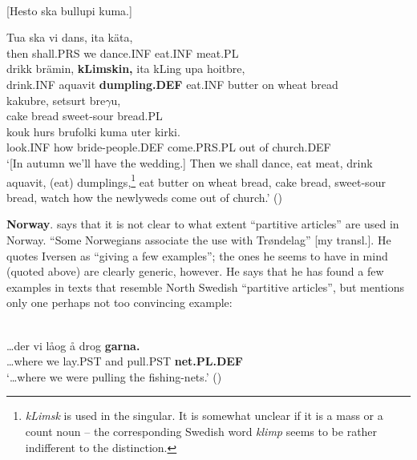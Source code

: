 
\ea\label{}
\\
{}[Hesto ska bullupi kuma.] 

\gll 	Tua  ska  vi  dans,  ita  käta,\\
		then   shall.PRS  we  dance.INF  eat.INF  meat.PL\\
\gll 	drikk  brämin,  \textbf{kLimskin,} ita  kLing  upa  hoitbre,\\
		drink.INF  aquavit  \textbf{dumpling.DEF  } eat.INF  butter  on  wheat bread\\
\gll 	kakubre,  setsurt  bre$\gamma $u,\\
		cake bread  sweet-sour  bread.PL\\
\gll 	kouk  hurs  brufolki  kuma  uter  kirki.\\
		look.INF  how  bride-people.DEF  come.PRS.PL  out of   church.DEF\\
\glt 	‘[In autumn we’ll have the wedding.] Then we shall dance, eat meat, drink aquavit, (eat) dumplings,\footnote{ \textit{k}\textit{L}\textit{imsk} is used in the singular. It is somewhat unclear if it is a mass or a count noun – the corresponding Swedish word \textit{klimp} seems to be rather indifferent to the distinction.  } eat butter on wheat bread, cake bread, sweet-sour bread, watch how the newlyweds come out of church.’ (\citet[76]{Vendell1882})

\z

\textbf{Norway}. \citet[16]{Delsing2003a} says that it is not clear to what extent “partitive articles” are used in Norway. “Some Norwegians associate the use with Trøndelag” [my transl.]. He quotes Iversen as “giving a few examples”; the ones he seems to have in mind (quoted above) are clearly generic, however. He says that he has found a few examples in texts that resemble North Swedish “partitive articles”, but mentions only one perhaps not too convincing example: 


\ea \label{} 
\\
\gll …der  vi  låog  å  drog  \textbf{garna.}\textit{  }\\
…where  we  lay.PST   and  pull.PST  \textbf{net.PL.DEF} \\
\glt ‘…where we were pulling the fishing-nets.’ (\citet[16]{Delsing2003a})

